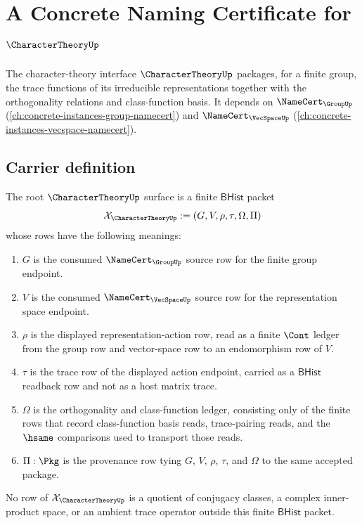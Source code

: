 \chapter{A Concrete Naming Certificate for $\CharacterTheoryUp$}
\label{ch:concrete-instances-charactertheory-namecert}

The character-theory interface $\CharacterTheoryUp$ packages, for a finite group, the trace functions of its irreducible representations together with the orthogonality relations and class-function basis. It depends on $\NameCert_{\GroupUp}$ (\autoref{ch:concrete-instances-group-namecert}) and $\NameCert_{\VecSpaceUp}$ (\autoref{ch:concrete-instances-vecspace-namecert}).

\section{Carrier definition}
\label{sec:charactertheory-carrier}

\begin{definition}
\label{def:charactertheory-root-bhist-surface}
The root $\CharacterTheoryUp$ surface is a finite $\mathsf{BHist}$ packet
$$
\mathcal{X}_{\CharacterTheoryUp}:=(G,V,\rho,\tau,\Omega,\Pi)
$$
whose rows have the following meanings:
\begin{enumerate}
  \item $G$ is the consumed $\NameCert_{\GroupUp}$ source row for the finite group endpoint.
  \item $V$ is the consumed $\NameCert_{\VecSpaceUp}$ source row for the representation space endpoint.
  \item $\rho$ is the displayed representation-action row, read as a finite $\Cont$ ledger from the group row and vector-space row to an endomorphism row of $V$.
  \item $\tau$ is the trace row of the displayed action endpoint, carried as a $\mathsf{BHist}$ readback row and not as a host matrix trace.
  \item $\Omega$ is the orthogonality and class-function ledger, consisting only of the finite rows that record class-function basis reads, trace-pairing reads, and the $\hsame$ comparisons used to transport those reads.
  \item $\Pi:\Pkg$ is the provenance row tying $G$, $V$, $\rho$, $\tau$, and $\Omega$ to the same accepted package.
\end{enumerate}
No row of $\mathcal{X}_{\CharacterTheoryUp}$ is a quotient of conjugacy classes, a complex inner-product space, or an ambient trace operator outside this finite $\mathsf{BHist}$ packet.
\end{definition}

